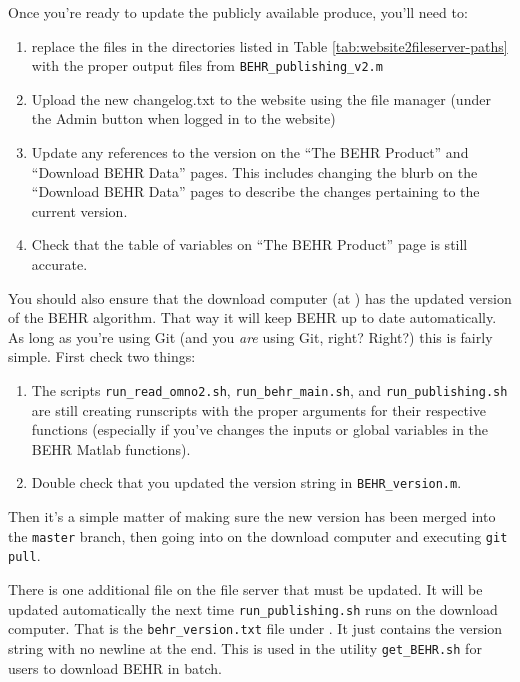 \documentclass[12pt]{article}
\begin{document}
	Once you're ready to update the publicly available produce, you'll need to:
	
	\begin{enumerate}
	\item replace the files in the directories listed in Table \ref{tab:website2fileserver-paths} with the proper output files from \lstinline$BEHR_publishing_v2.m$
	\item Upload the new changelog.txt to the website using the file manager (under the Admin button when logged in to the website)
	\item Update any references to the version on the ``The BEHR Product'' and ``Download BEHR Data'' pages. This includes changing the blurb on the ``Download BEHR Data'' pages to describe the changes pertaining to the current version.
	\item Check that the table of variables on ``The BEHR Product'' page is still accurate.
	\end{enumerate}
	
	You should also ensure that the download computer (at ) has the updated version of the BEHR algorithm. That way it will keep BEHR up to date automatically. As long as you're using Git (and you \emph{are} using Git, right? Right?) this is fairly simple. First check two things:
	
	\begin{enumerate}
	\item The scripts \lstinline$run_read_omno2.sh$, \lstinline$run_behr_main.sh$, and \lstinline$run_publishing.sh$ are still creating runscripts with the proper arguments for their respective functions (especially if you've changes the inputs or global variables in the BEHR Matlab functions).
	
	\item Double check that you updated the version string in \lstinline$BEHR_version.m$.
	\end{enumerate}		
	
	Then it's a simple matter of making sure the new version has been merged into the \lstinline$master$ branch, then going into  on the download computer and executing \lstinline$git pull$. 
	
	There is one additional file on the file server that must be updated.  It will be updated automatically the next time \lstinline$run_publishing.sh$ runs on the download computer. That is the \lstinline$behr_version.txt$ file under . It just contains the version string with no newline at the end.  This is used in the utility \lstinline$get_BEHR.sh$ for users to download BEHR in batch.
	
\end{document}

